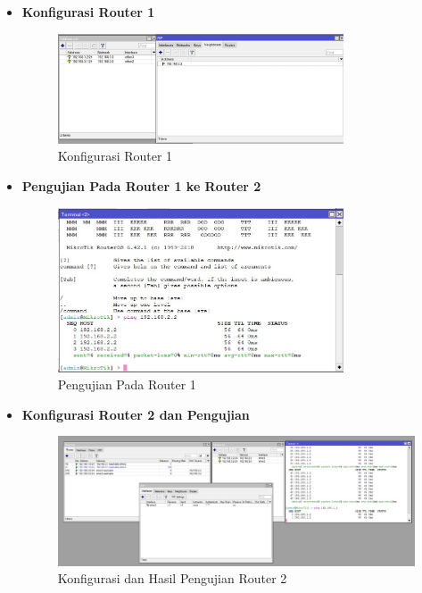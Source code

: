 \begin{itemize}
    \item \textbf{Konfigurasi Router 1}
    \begin{figure} [H]
        \centering
        \includegraphics[width=0.8\textwidth]{img/percobaan 2_1_config.jpeg}
        \caption{Konfigurasi Router 1}
        \label{fig:router1_2}
    \end{figure}

    
    \item \textbf{Pengujian Pada Router 1 ke Router 2}
    \begin{figure} [H]
        \centering
        \includegraphics[width=0.8\textwidth]{img/percobaan 2_1_hasil.jpeg}
        \caption{Pengujian Pada Router 1}
        \label{fig:ping1_2}
    \end{figure}

    \item \textbf{Konfigurasi Router 2 dan Pengujian}
    \begin{figure} [H]
        \centering
        \includegraphics[width=1\textwidth]{img/percobaan 2_2.jpeg}
        \caption{Konfigurasi dan Hasil Pengujian Router 2}
        \label{fig:router2_2}
    \end{figure}
\end{itemize}

